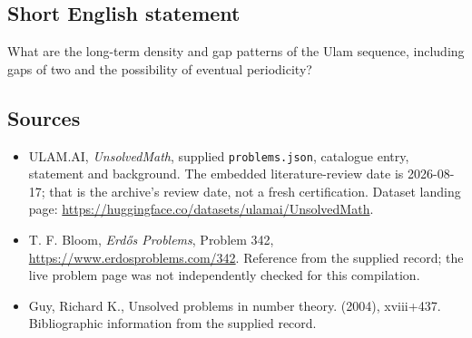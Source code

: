 \documentclass[11pt,a4paper]{article}
\begin{document}
\subsection{Short English statement}

What are the long-term density and gap patterns of the Ulam sequence, including gaps of two and the possibility of eventual periodicity?

\subsection{Sources}

{\small

\begin{itemize}

\item[\hypertarget{source:statement:1}{S1}] ULAM.AI, \emph{UnsolvedMath}, supplied \texttt{problems.json}, catalogue entry, statement and background. The embedded literature-review date is 2026-08-17; that is the archive’s review date, not a fresh certification. Dataset landing page: \url{https://huggingface.co/datasets/ulamai/UnsolvedMath}.

\item[\hypertarget{source:statement:2}{S2}] T. F. Bloom, \emph{Erdős Problems}, Problem 342, \url{https://www.erdosproblems.com/342}. Reference from the supplied record; the live problem page was not independently checked for this compilation.

\item[\hypertarget{source:statement:3}{S3}] Guy, Richard K., Unsolved problems in number theory. (2004), xviii+437. Bibliographic information from the supplied record.

\end{itemize}

}

\label{end:statement}
\end{document}
